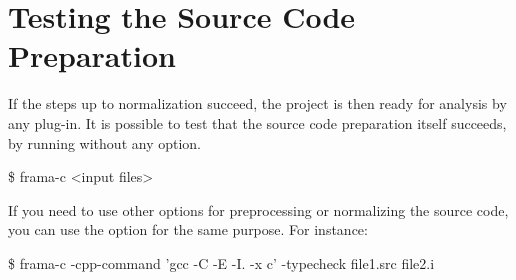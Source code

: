 
\section{Testing the Source Code Preparation}

If the steps up to normalization succeed, the project is then ready for
analysis by any \FramaC plug-in. It is possible to test that the source code
preparation itself succeeds, by running \FramaC without any option.
\begin{frama-c-commands}
\$ frama-c <input files>
\end{frama-c-commands}

If you need to use other options for preprocessing or normalizing the source
code, you can use the option  for
the same purpose. For instance:
\begin{frama-c-commands}
\$ frama-c -cpp-command 'gcc -C -E -I. -x c' -typecheck file1.src file2.i
\end{frama-c-commands}


